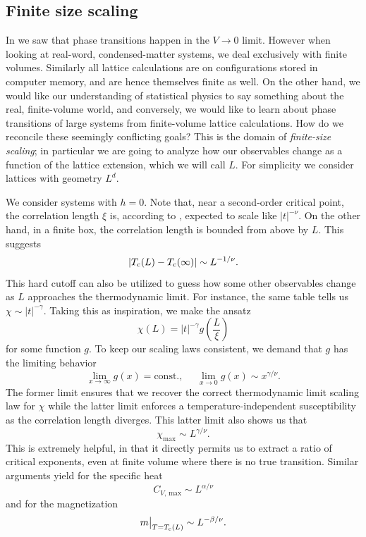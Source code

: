 \subsection{Finite size scaling}

In  we saw that phase transitions happen in the $V\to0$
limit. However when looking at real-word, condensed-matter systems, we deal
exclusively with finite volumes. Similarly all lattice calculations are on
configurations stored in computer memory, and are hence themselves finite as
well. On the other hand, we would like our understanding of statistical physics
to say something about the real, finite-volume world, and conversely, we would
like to learn about phase transitions of large systems from finite-volume
lattice calculations. How do we reconcile these seemingly conflicting goals?
This is the domain of {\it finite-size scaling}; in particular we are going to analyze
how our observables change as a function of the lattice extension, which we will
call $L$. For simplicity we consider lattices with geometry $L^d$.

We consider systems with $h=0$. 
Note that, near a second-order critical point, the correlation
length $\xi$ is, according to , expected to scale like
$|t|^{-\nu}$. On the other hand, in a finite box, the correlation length is bounded
from above by $L$. This suggests
\begin{equation}
    |T_{\rm c}(L)-T_{\rm c}(\infty)|\sim L^{-1/\nu}.
\end{equation}
This hard cutoff can also be utilized to guess how some other observables
change as $L$ approaches the thermodynamic limit. For instance, the same
table tells us $\chi\sim|t|^{-\gamma}$. Taking this as inspiration, we
make the ansatz
\begin{equation}
    \chi(L)=|t|^{-\gamma}g\left(\frac{L}{\xi}\right)
\end{equation}
for some function $g$. To keep our scaling laws consistent, we demand that 
$g$ has the limiting behavior
\begin{equation}
    \lim_{x\to\infty}g(x)=\text{const.},~~~~~~\lim_{x\to0}g(x)\sim x^{\gamma/\nu}.
\end{equation}
The former limit ensures that we recover the correct thermodynamic limit scaling law
for $\chi$ while the latter limit enforces a temperature-independent susceptibility
as the correlation length diverges. This latter limit also shows us that
\begin{equation}\label{eq:fss_susc_2nd}
    \chi_{\text{max}}\sim L^{\gamma/\nu}.
\end{equation}
This is extremely helpful, in that it directly permits us to extract a ratio of
critical exponents, even at finite volume where there is no true transition.
Similar arguments yield for the specific heat
\begin{equation}\label{eq:fss_CV}
    C_{V,\,\text{max}}\sim L^{\alpha/\nu}
\end{equation}
and for the magnetization
\begin{equation}\label{eq:fss_M}
    m\big|_{T=T_{\rm c}(L)}\sim L^{-\beta/\nu}.
\end{equation}


